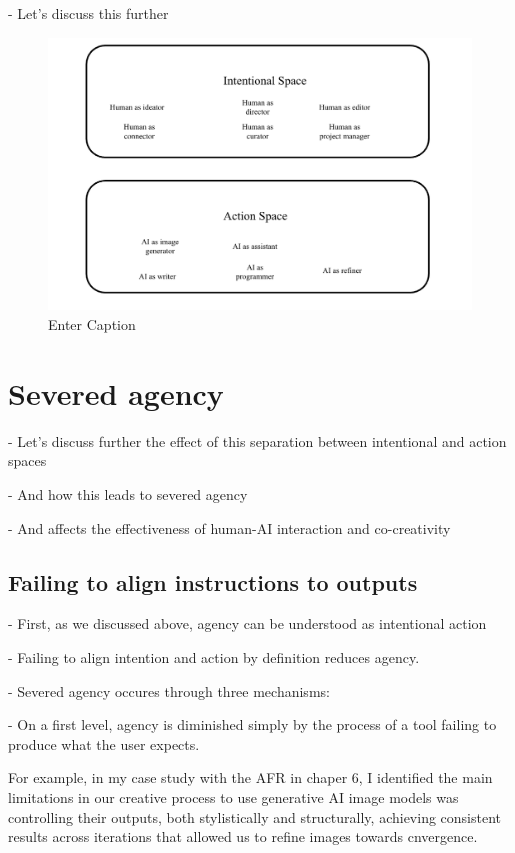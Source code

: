 - Let's discuss this further


\begin{figure}
    \centering
    \includegraphics[width=0.75\linewidth]{rolesinspaces.png}
    \caption{Enter Caption}
    \label{fig:enter-label}
\end{figure}

\section{Severed agency}

- Let's discuss further the effect of this separation between intentional and action spaces

- And how this leads to severed agency

- And affects the effectiveness of human-AI interaction and co-creativity

\subsection{Failing to align instructions to outputs}

- First, as we discussed above, agency can be understood as intentional action

- Failing to align intention and action by definition reduces agency. 

- Severed agency occures through three mechanisms:

- On a first level, agency is diminished simply by the process of a tool failing to produce what the user expects. 

For example, in my case study with the AFR in chaper 6, I identified the main limitations in our creative process to use generative AI image models was controlling their outputs, both stylistically and structurally, achieving consistent results across iterations that allowed us to refine images towards cnvergence.  


